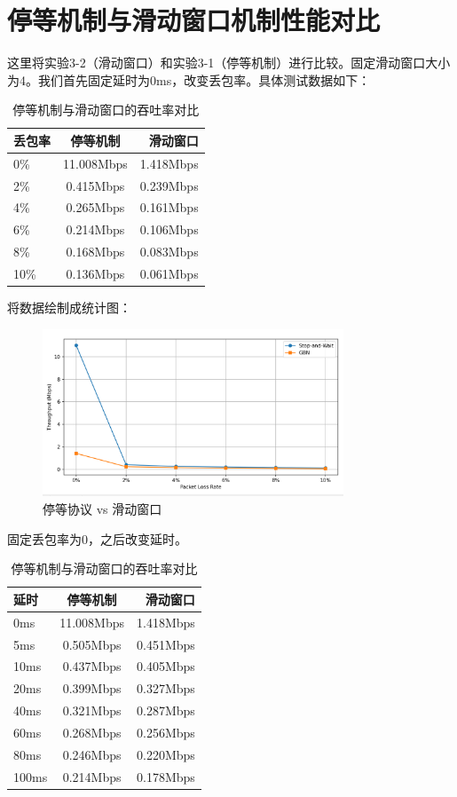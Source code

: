 \documentclass[UTF8,a4paper,10pt]{ctexart}
\begin{document}
\section{停等机制与滑动窗口机制性能对比}
这里将实验3-2（滑动窗口）和实验3-1（停等机制）进行比较。固定滑动窗口大小为4。我们首先固定延时为0ms，改变丢包率。具体测试数据如下：
\begin{table}[h!]
  \centering
  \begin{tabular}{|l|c|r|} %
    \hline
     丢包率   & 停等机制    & 滑动窗口 \\ \hline
    0\% & 11.008Mbps & 1.418Mbps \\ \hline
    2\% & 0.415Mbps & 0.239Mbps \\ \hline
    4\% & 0.265Mbps & 0.161Mbps \\ \hline
    6\% & 0.214Mbps & 0.106Mbps \\ \hline
    8\% & 0.168Mbps & 0.083Mbps \\ \hline
    10\% & 0.136Mbps & 0.061Mbps \\ \hline
  \end{tabular}
  \caption{停等机制与滑动窗口的吞吐率对比}
  \label{tab:my_label}
\end{table}\par
将数据绘制成统计图：
\begin{figure}[H]
    \centering
\includegraphics[width=0.8\textwidth]{img/p1-1.png}
    \caption{停等协议 vs 滑动窗口}
\end{figure}
固定丢包率为0，之后改变延时。
\begin{table}[h!]
  \centering
  \begin{tabular}{|l|c|r|} %
    \hline
  延时    & 停等机制    & 滑动窗口      \\ \hline
  0ms	   & 11.008Mbps & 1.418Mbps    \\ \hline
  5ms	   & 0.505Mbps	& 0.451Mbps    \\ \hline
 10ms	& 0.437Mbps  & 0.405Mbps    \\ \hline
 20ms	& 0.399Mbps  & 0.327Mbps    \\ \hline  
 40ms	& 0.321Mbps	 & 0.287Mbps    \\ \hline
 60ms	& 0.268Mbps	 & 0.256Mbps    \\ \hline
 80ms	& 0.246Mbps  & 0.220Mbps    \\ \hline
100ms	 & 0.214Mbps  & 0.178Mbps    \\ \hline
  \end{tabular}
  \caption{停等机制与滑动窗口的吞吐率对比}
  \label{tab:my_label}
\end{table}\par
\end{document}
